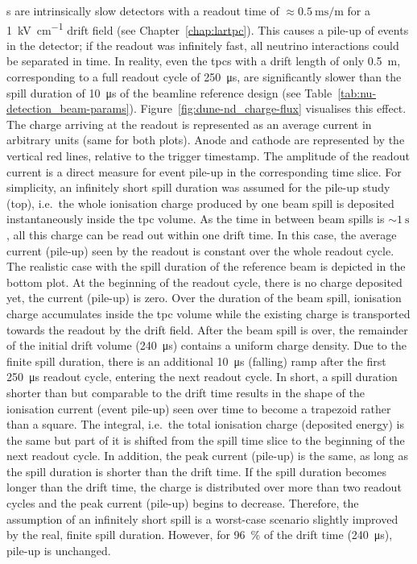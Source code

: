 \lartpc{}s are intrinsically slow detectors with a readout time of $\approx \SI{0.5}{\milli\second\per\metre}$ for a \SI{1}{\kilo\volt\per\centi\metre} drift field (see Chapter~\ref{chap:lartpc}).
This causes a pile-up of events in the detector; if the readout was infinitely fast, all neutrino interactions could be separated in time.
In reality, even the \AC{} \glspl{tpc} with a drift length of only \SI{0.5}{\metre}, corresponding to a full readout cycle of \SI{250}{\micro\second}, are significantly slower than the spill duration of \SI{10}{\micro\second} of the \dune{} beamline reference design (see Table~\ref{tab:nu-detection_beam-params}).
Figure~\ref{fig:dune-nd_charge-flux} visualises this effect.
The charge arriving at the readout is represented as an average current in arbitrary units (same for both plots).
Anode and cathode are represented by the vertical red lines, relative to the trigger timestamp.
The amplitude of the readout current is a direct measure for event pile-up in the corresponding time slice.
For simplicity, an infinitely short spill duration was assumed for the pile-up study (top), i.e.\ the whole ionisation charge produced by one beam spill is deposited instantaneously inside the \gls{tpc} volume.
As the time in between beam spills is $\sim{\SI{1}{\second}}$, all this charge can be read out within one drift time.
In this case, the average current (pile-up) seen by the readout is constant over the whole readout cycle.
The realistic case with the spill duration of the \dune{} reference beam is depicted in the bottom plot.
At the beginning of the readout cycle, there is no charge deposited yet, the current (pile-up) is zero.
Over the duration of the beam spill, ionisation charge accumulates inside the \gls{tpc} volume while the existing charge is transported towards the readout by the drift field.
After the beam spill is over, the remainder of the initial drift volume (\SI{240}{\micro\second}) contains a uniform charge density.
Due to the finite spill duration, there is an additional \SI{10}{\micro\second} (falling) ramp after the first \SI{250}{\micro\second} readout cycle, entering the next readout cycle.
In short, a spill duration shorter than but comparable to the drift time results in the shape of the ionisation current (event pile-up) seen over time to become a trapezoid rather than a square.
The integral, i.e.\ the total ionisation charge (deposited energy) is the same but part of it is shifted from the spill time slice to the beginning of the next readout cycle.
In addition, the peak current (pile-up) is the same, as long as the spill duration is shorter than the drift time.
If the spill duration becomes longer than the drift time, the charge is distributed over more than two readout cycles and the peak current (pile-up) begins to decrease.
Therefore, the assumption of an infinitely short spill is a worst-case scenario slightly improved by the real, finite spill duration.
However, for \SI{96}{\percent} of the drift time (\SI{240}{\micro\second}), pile-up is unchanged.


